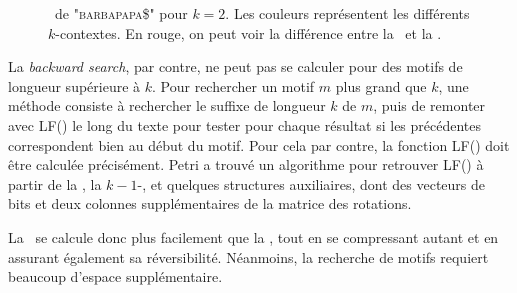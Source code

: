 \begin{figure}
\caption{\kbwt\ de \textsc{"barbapapa\$"} pour $k = 2$. Les couleurs représentent les différents $k$-contextes. En rouge, on peut voir la différence entre la \bwt\ et la \kbwt.}
\label{kbwt}
\end{figure}



La \textit{backward search}, par contre, ne peut pas se calculer pour des motifs de longueur supérieure à $k$. Pour rechercher un motif $m$ plus grand que $k$, une méthode consiste à rechercher le suffixe de longueur $k$ de $m$, puis de remonter avec LF() le long du texte pour tester pour chaque résultat si les précédentes correspondent bien au début du motif. Pour cela par contre, la fonction LF() doit être calculée précisément. Petri a trouvé un algorithme pour retrouver LF() à partir de la \kbwt, la $k-1$-\bwt, et quelques structures auxiliaires, dont des vecteurs de bits et deux colonnes supplémentaires de la matrice des rotations.

La \kbwt\ se calcule donc plus facilement que la \bwt, tout en se compressant autant et en assurant également sa réversibilité. Néanmoins, la recherche de motifs requiert beaucoup d'espace supplémentaire.
